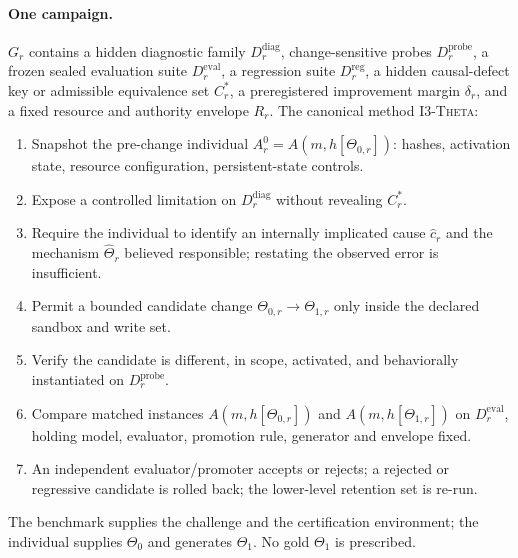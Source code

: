 \paragraph{One campaign.} $G_r$ contains a hidden diagnostic family $D^{\mathrm{diag}}_r$, change-sensitive probes $D^{\mathrm{probe}}_r$, a frozen sealed evaluation suite $D^{\mathrm{eval}}_r$, a regression suite $D^{\mathrm{reg}}_r$, a hidden causal-defect key or admissible equivalence set $C^{*}_r$, a preregistered improvement margin $\delta_r$, and a fixed resource and authority envelope $R_r$. The canonical method \textsc{I3-Theta}:
\begin{enumerate}[leftmargin=*,itemsep=1pt]
\item Snapshot the pre-change individual $A^{0}_r = A(m, h[\Theta_{0,r}])$: hashes, activation state, resource configuration, persistent-state controls.
\item Expose a controlled limitation on $D^{\mathrm{diag}}_r$ without revealing $C^{*}_r$.
\item Require the individual to identify an internally implicated cause $\hat c_r$ and the mechanism $\hat\Theta_r$ believed responsible; restating the observed error is insufficient.
\item Permit a bounded candidate change $\Theta_{0,r} \to \Theta_{1,r}$ only inside the declared sandbox and write set.
\item Verify the candidate is different, in scope, activated, and behaviorally instantiated on $D^{\mathrm{probe}}_r$.
\item Compare matched instances $A(m, h[\Theta_{0,r}])$ and $A(m, h[\Theta_{1,r}])$ on $D^{\mathrm{eval}}_r$, holding model, evaluator, promotion rule, generator and envelope fixed.
\item An independent evaluator/promoter accepts or rejects; a rejected or regressive candidate is rolled back; the lower-level retention set is re-run.
\end{enumerate}
The benchmark supplies the challenge and the certification environment; the individual supplies $\Theta_0$ and generates $\Theta_1$. No gold $\Theta_1$ is prescribed.

